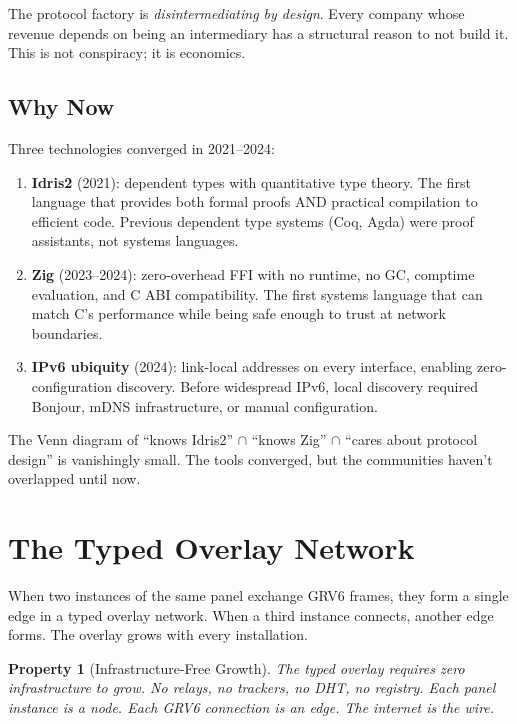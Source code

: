 \documentclass[11pt,a4paper]{article}
\newtheorem{property}{Property}
\begin{document}
The protocol factory is \emph{disintermediating by design}. Every
company whose revenue depends on being an intermediary has a structural
reason to not build it. This is not conspiracy; it is economics.

\subsection{Why Now}

Three technologies converged in 2021--2024:

\begin{enumerate}
\item \textbf{Idris2} (2021): dependent types with quantitative type
  theory. The first language that provides both formal proofs AND
  practical compilation to efficient code. Previous dependent type
  systems (Coq, Agda) were proof assistants, not systems languages.

\item \textbf{Zig} (2023--2024): zero-overhead FFI with no runtime, no
  GC, comptime evaluation, and C ABI compatibility. The first systems
  language that can match C's performance while being safe enough to
  trust at network boundaries.

\item \textbf{IPv6 ubiquity} (2024): link-local addresses on every
  interface, enabling zero-configuration discovery. Before widespread
  IPv6, local discovery required Bonjour, mDNS infrastructure, or
  manual configuration.
\end{enumerate}

The Venn diagram of ``knows Idris2'' $\cap$ ``knows Zig'' $\cap$
``cares about protocol design'' is vanishingly small. The tools
converged, but the communities haven't overlapped until now.

\section{The Typed Overlay Network}

When two instances of the same panel exchange GRV6 frames, they form a
single edge in a typed overlay network. When a third instance connects,
another edge forms. The overlay grows with every installation.

\begin{property}[Infrastructure-Free Growth]
The typed overlay requires zero infrastructure to grow. No relays, no
trackers, no DHT, no registry. Each panel instance is a node. Each
GRV6 connection is an edge. The internet is the wire.
\end{property}
\end{document}
